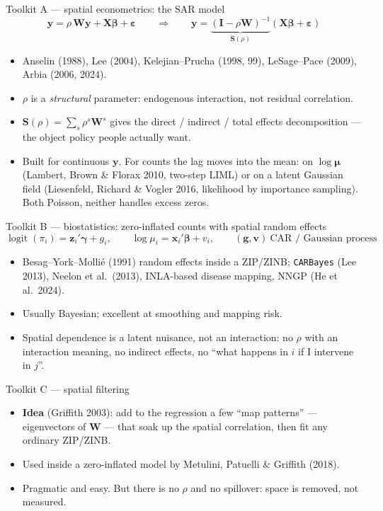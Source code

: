 \documentclass[10pt,aspectratio=169]{beamer}
\newcommand{\bW}{\mathbf{W}}
\newcommand{\bX}{\mathbf{X}}
\newcommand{\by}{\mathbf{y}}
\newcommand{\bI}{\mathbf{I}}
\newcommand{\bS}{\mathbf{S}}
\newcommand{\bbeta}{\boldsymbol{\beta}}
\newcommand{\bgamma}{\boldsymbol{\gamma}}
\newcommand{\bmu}{\boldsymbol{\mu}}
\DeclareMathOperator{\logit}{logit}
\begin{document}
\begin{frame}{Toolkit A --- spatial econometrics: the SAR model}
  \[
    \by = \rho\,\bW\by + \bX\bbeta + \boldsymbol{\varepsilon}
    \qquad\Longrightarrow\qquad
    \by = \underbrace{(\bI-\rho\bW)^{-1}}_{\bS(\rho)}(\bX\bbeta+\boldsymbol{\varepsilon})
  \]
  \begin{itemize}\setlength{\itemsep}{0.4em}
    \item Anselin (1988), Lee (2004), Kelejian--Prucha (1998, 99), LeSage--Pace (2009), Arbia (2006, 2024).
    \item $\rho$ is a \emph{structural} parameter: endogenous interaction, not residual correlation.
    \item $\bS(\rho)=\sum_s \rho^s\bW^s$ gives the \alert{direct / indirect / total effects} decomposition --- the object policy people actually want.
    \item Built for continuous $\by$. For counts the lag moves into the mean: on $\log\bmu$ (Lambert, Brown \& Florax 2010, two-step LIML) or on a latent Gaussian field (Liesenfeld, Richard \& Vogler 2016, likelihood by importance sampling). Both Poisson, neither handles excess zeros.
  \end{itemize}
\end{frame}

\begin{frame}{Toolkit B --- biostatistics: zero-inflated counts with spatial random effects}
  \[
    \logit(\pi_i) = \mathbf z_i'\bgamma + g_i, \qquad
    \log\mu_i = \mathbf x_i'\bbeta + v_i, \qquad (\mathbf g,\mathbf v)\ \text{CAR / Gaussian process}
  \]
  \begin{itemize}\setlength{\itemsep}{0.4em}
    \item Besag--York--Mollié (1991) random effects inside a ZIP/ZINB; \texttt{CARBayes} (Lee 2013), Neelon et al.\ (2013), INLA-based disease mapping, NNGP (He et al.\ 2024).
    \item Usually Bayesian; excellent at smoothing and mapping risk.
    \item Spatial dependence is a \alert{latent nuisance}, not an interaction: no $\rho$ with an interaction meaning, no indirect effects, no ``what happens in $i$ if I intervene in $j$''.
  \end{itemize}
\end{frame}

\begin{frame}{Toolkit C --- spatial filtering}
  \begin{itemize}\setlength{\itemsep}{0.8em}
    \item \textbf{Idea} (Griffith 2003): add to the regression a few ``map patterns'' --- eigenvectors of $\bW$ --- that soak up the spatial correlation, then fit any ordinary ZIP/ZINB.
    \item Used inside a zero-inflated model by Metulini, Patuelli \& Griffith (2018).
    \item Pragmatic and easy. But there is no $\rho$ and no spillover: space is \alert{removed}, not measured.
  \end{itemize}
\end{frame}
\end{document}
